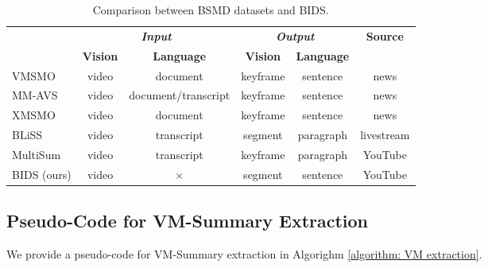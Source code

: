 \begin{table*}[b]
\centering

\begin{tabular}{lccccc}

\toprule
\multirow{2}{*}{} & \multicolumn{2}{c}{\textbf{\textit{Input}}}    & \multicolumn{2}{c}{\textbf{\textit{Output}}} & \multirow{2}{*}{\textbf{Source}} \\
\cmidrule(r){2-3} \cmidrule(r){4-5}
                  & \textbf{Vision} & \textbf{Language}            & \textbf{Vision}       & \textbf{Language}    &                         \\
\midrule
VMSMO~\cite{li2020vmsmo}             & video  & document            & keyframe     & sentence    & news                    \\
MM-AVS~\cite{fu2020multi}            & video  & document/transcript & keyframe    & sentence    & news                    \\
XMSMO~\cite{tang2023tldw}             & video  & document            & keyframe     & sentence    & news                    \\
BLiSS~\cite{he2023align}             & video  & transcript          & segment     & paragraph   & livestream              \\
MultiSum~\cite{qiu2023multisum}          & video  & transcript          & keyframe    & paragraph   & YouTube                 \\
BIDS (ours)             & video  & $\times$            & segment    & sentence    & YouTube  \\
\bottomrule
\end{tabular}
\label{tab: BSMD}
\caption{Comparison between BSMD datasets and BIDS.}
\end{table*}



\subsection{Pseudo-Code for VM-Summary Extraction}
\label{sec: pseudo code}

We provide a pseudo-code for VM-Summary extraction in Algorighm \ref{algorithm: VM extraction}.

